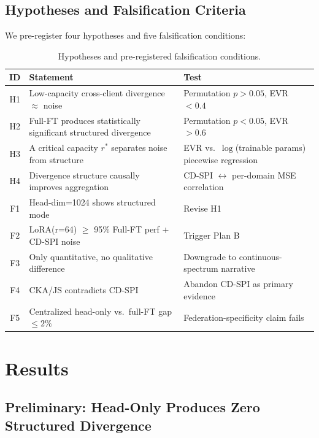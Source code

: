 \documentclass{article}
\begin{document}
\subsection{Hypotheses and Falsification Criteria}

We pre-register four hypotheses and five falsification conditions:

\begin{table}[h]
\centering
\caption{Hypotheses and pre-registered falsification conditions.}
\label{tab:hypotheses}
\small
\begin{tabular}{@{}cll@{}}
\toprule
\textbf{ID} & \textbf{Statement} & \textbf{Test} \\
\midrule
H1 & Low-capacity cross-client divergence $\approx$ noise & Permutation $p > 0.05$, EVR $< 0.4$ \\
H2 & Full-FT produces statistically significant structured divergence & Permutation $p < 0.05$, EVR $> 0.6$ \\
H3 & A critical capacity $r^*$ separates noise from structure & EVR vs.~$\log$(trainable params) piecewise regression \\
H4 & Divergence structure causally improves aggregation & CD-SPI $\leftrightarrow$ per-domain MSE correlation \\
\midrule
F1 & Head-dim=1024 shows structured mode & Revise H1 \\
F2 & LoRA(r=64) $\geq$ 95\% Full-FT perf + CD-SPI noise & Trigger Plan B \\
F3 & Only quantitative, no qualitative difference & Downgrade to continuous-spectrum narrative \\
F4 & CKA/JS contradicts CD-SPI & Abandon CD-SPI as primary evidence \\
F5 & Centralized head-only vs.~full-FT gap $\leq 2\%$ & Federation-specificity claim fails \\
\bottomrule
\end{tabular}
\end{table}

\section{Results}

\subsection{Preliminary: Head-Only Produces Zero Structured Divergence}
\end{document}
